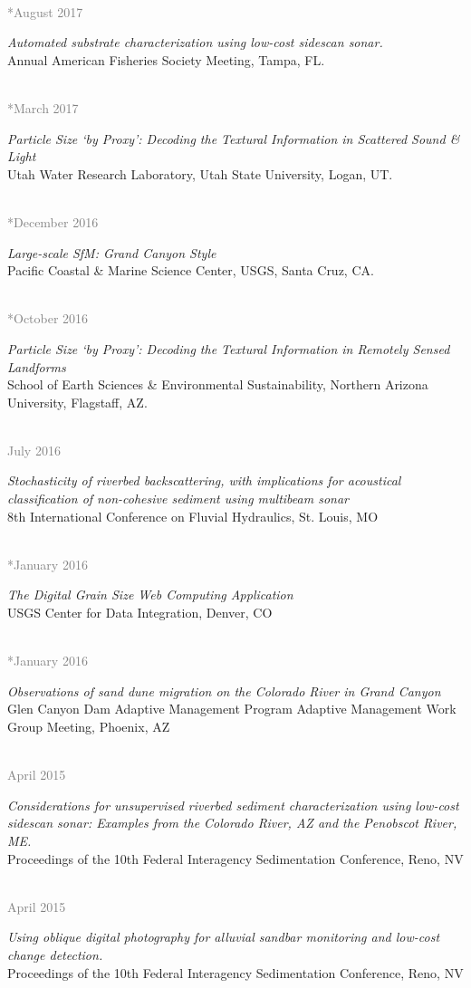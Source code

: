 \documentclass{article} %
\newlength\sidebarwidth
\newcommand{\dateonly}[2][]
	 {\begin{minipage}{\textwidth}
	 \vspace*{.4\baselineskip}
         \nopagebreak\hspace{0in}%
         \nopagebreak\begin{minipage}[t]{\sidebarwidth - .2cm}
         \raggedleft {~}
         {\\[-\baselineskip] \textcolor{gray}{\footnotesize #1}}
	 \end{minipage}%
	 \hfill
	 \begin{minipage}[t]{\linewidth - \sidebarwidth}
	 #2%
	 \end{minipage}%
	 \vspace*{.2\baselineskip plus 1\baselineskip minus
	 .2\baselineskip}%
	 \end{minipage}}
\begin{document}
  \dateonly[**August 2017]{
      {\it Automated substrate characterization using low-cost sidescan sonar.}\\
      Annual American Fisheries Society Meeting, Tampa, FL.
  }

  \dateonly[**March 2017]{
      {\it Particle Size `by Proxy': Decoding the Textural Information in Scattered Sound \& Light}\\
      Utah Water Research Laboratory, Utah State University, Logan, UT.
  }

  \dateonly[**December 2016]{
      {\it Large-scale SfM: Grand Canyon Style}\\
      Pacific Coastal \& Marine Science Center, USGS, Santa Cruz, CA.
  }

  \dateonly[**October 2016]{
      {\it Particle Size `by Proxy': Decoding the Textural Information in Remotely Sensed Landforms}\\
      School of Earth Sciences \& Environmental Sustainability, Northern Arizona University, Flagstaff, AZ.
  }

  \dateonly[July 2016]{
      {\it Stochasticity of riverbed backscattering, with implications for acoustical classification of non-cohesive sediment using multibeam sonar}\\
    8th International Conference on Fluvial Hydraulics, St. Louis, MO
  }

  \dateonly[**January 2016]{
      {\it The Digital Grain Size Web Computing Application}\\
      USGS Center for Data Integration, Denver, CO
  }

  \dateonly[**January 2016]{
      {\it Observations of sand dune migration on the Colorado River in Grand Canyon}\\
      Glen Canyon Dam Adaptive Management Program Adaptive Management Work Group Meeting, Phoenix, AZ
  }

  \dateonly[April 2015]{
      {\it Considerations for unsupervised riverbed sediment characterization using low-cost sidescan sonar: Examples from the Colorado River, AZ and the Penobscot River, ME.}\\
      Proceedings of the 10th Federal Interagency Sedimentation Conference, Reno, NV
  }

  \dateonly[April 2015]{
      {\it Using oblique digital photography for alluvial sandbar monitoring and low-cost change detection.}\\
      Proceedings of the 10th Federal Interagency Sedimentation Conference, Reno, NV
  }
\end{document}
